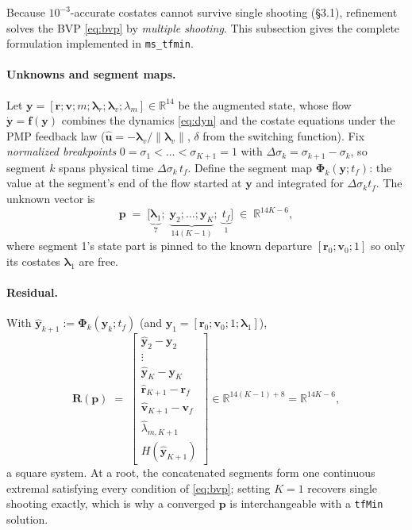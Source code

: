 \documentclass[11pt]{article}
\newcommand{\Rv}{\bm{r}}
\newcommand{\Vv}{\bm{v}}
\newcommand{\lr}{\bm{\lambda}_r}
\newcommand{\lv}{\bm{\lambda}_v}
\newcommand{\uh}{\hat{\bm{u}}}
\begin{document}
Because $10^{-3}$-accurate costates cannot survive single shooting
(\S3.1), refinement solves the BVP \eqref{eq:bvp} by \emph{multiple
shooting}. This subsection gives the complete formulation implemented in
\texttt{ms\_tfmin}.

\paragraph{Unknowns and segment maps.} Let
$\bm y = [\Rv;\Vv;m;\lr;\lv;\lambda_m] \in \mathbb{R}^{14}$ be the
augmented state, whose flow $\dot{\bm y} = \bm f(\bm y)$ combines the
dynamics \eqref{eq:dyn} and the costate equations under the PMP feedback
law ($\uh = -\lv/\lVert\lv\rVert$, $\delta$ from the switching function).
Fix \emph{normalized breakpoints} $0=\sigma_1<\dots<\sigma_{K+1}=1$ with
$\Delta\sigma_k = \sigma_{k+1}-\sigma_k$, so segment $k$ spans physical
time $\Delta\sigma_k\,t_f$. Define the segment map
$\bm\Phi_k(\bm y;t_f)$: the value at the segment's end of the flow started
at $\bm y$ and integrated for $\Delta\sigma_k t_f$. The unknown vector is
\begin{equation}
\bm p \;=\; \big[\underbrace{\bm\lambda_1}_{7};\;
\underbrace{\bm y_2;\dots;\bm y_K}_{14(K-1)};\;
\underbrace{t_f}_{1}\big] \;\in\; \mathbb{R}^{14K-6},
\end{equation}
where segment 1's state part is pinned to the known departure
$[\Rv_0;\Vv_0;1]$ so only its costates $\bm\lambda_1$ are free.

\paragraph{Residual.} With
$\hat{\bm y}_{k+1} := \bm\Phi_k(\bm y_k; t_f)$ (and
$\bm y_1 = [\Rv_0;\Vv_0;1;\bm\lambda_1]$),
\begin{equation}
\bm R(\bm p) \;=\;
\begin{bmatrix}
\hat{\bm y}_2 - \bm y_2\\
\vdots\\
\hat{\bm y}_K - \bm y_K\\[3pt]
\hat{\Rv}_{K+1} - \Rv_f\\
\hat{\Vv}_{K+1} - \Vv_f\\
\hat\lambda_{m,K+1}\\
H(\hat{\bm y}_{K+1})
\end{bmatrix}
\in \mathbb{R}^{14(K-1)+8} = \mathbb{R}^{14K-6},
\end{equation}
a square system. At a root, the concatenated segments form one continuous
extremal satisfying every condition of \eqref{eq:bvp}; setting $K=1$
recovers single shooting exactly, which is why a converged $\bm p$ is
interchangeable with a \texttt{tfMin} solution.
\end{document}
